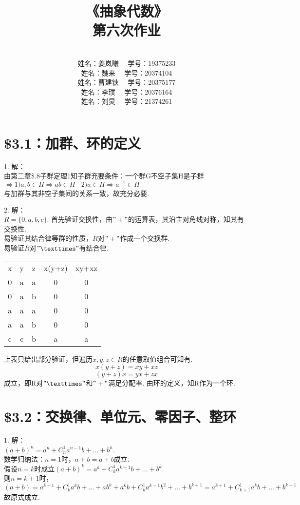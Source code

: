 \documentclass{ctexart}
\title{《抽象代数》\\ 第六次作业}
\author{\\姓名：姜岚曦 \ \ 学号：19375233
		\\姓名：魏来   \ \ 学号：20374104         
	    \\姓名：曹建钬 \ \ 学号：20375177
        \\姓名：李璞   \ \ 学号：20376164
        \\姓名：刘炅   \ \ 学号：21374261}
\date{}
\begin{document}
\pagestyle{empty}
\thispagestyle{empty}
\maketitle
\clearpage	
	
\section*{\$3.1：加群、环的定义}
1.
解：\\
由第二章\$.8子群定理1知子群充要条件：一个群G不空子集H是子群$\Leftrightarrow 1)a,b \in H \Rightarrow ab \in H \ \ \ \ 2) a\in H \Rightarrow a^{-1} \in H$ \\
与加群与其非空子集间的关系一致，故充分必要.

2.
解：\\
$R=\{0,a,b,c\}$.
首先验证交换性，由$"+"$的运算表，其沿主对角线对称，知其有交换性.\\
易验证其结合律等群的性质，$R$对$"+"$作成一个交换群.\\
易验证$R$对$"×"$有结合律.
\begin{center}
	\begin{tabular}{ccccc}
		x & y & z & x(y+z) & xy+xz\\
		0 & a & a & 0 & 0\\
		0 & a & b & 0 & 0\\
		a & a & a & 0 & 0\\
		a & a & b & 0 & 0\\
		c & c & b & a & a\\				
	\end{tabular} 
\end{center}
上表只给出部分验证，但遍历$x,y,z \in R$的任意取值组合可知有.
\begin{equation*}
	x(y+z)=xy+xz
\end{equation*}
\begin{equation*}
	(y+z)x=yx+zx
\end{equation*}
成立，即R对$"×"$和$"+"$满足分配率.
由环的定义，知R作为一个环.


\section*{\$3.2：交换律、单位元、零因子、整环}
1.
解：\\
$(a+b)^n=a^n+C_n^1a^{n-1}b+\ldots+b^n$. \\
数学归纳法：$n=1$时，$a+b=a+b$成立. \\
假设$n=k$时成立$(a+b)^k=a^k+C_k^1a^{k-1}b+\ldots+b^k$. \\
则$n=k+1$时，$(a+b)=a^{k+1}+C_k^1a^kb+\ldots+ab^k+a^kb+C_k^1a^{k-1}b^2+\ldots+b^{k+1}=a^{k+1}+C_{k+1}^1a^kb+\ldots+b^{k+1}$\\
故原式成立.
\end{document}
